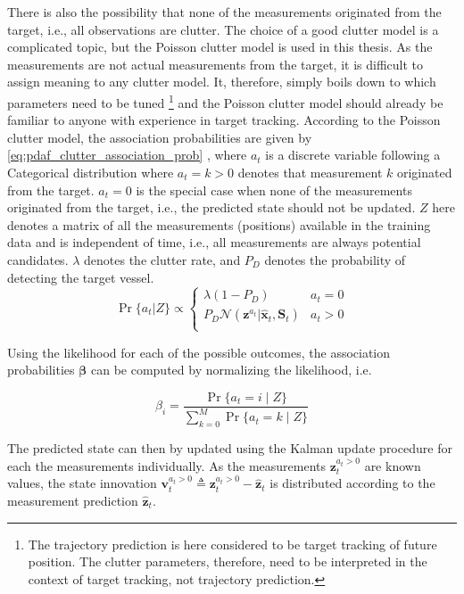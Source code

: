 There is also the possibility that none of the measurements originated from the target, i.e., all observations are clutter. The choice of a good clutter model is a complicated topic, but the Poisson clutter model is used in this thesis. As the measurements are not actual measurements from the target, it is difficult to assign meaning to any clutter model. It, therefore, simply boils down to which parameters need to be tuned \footnote{The trajectory prediction is here considered to be target tracking of future position. The clutter parameters, therefore, need to be interpreted in the context of target tracking, not trajectory prediction.} and the Poisson clutter model should already be familiar to anyone with experience in target tracking.
According to the Poisson clutter model, the association probabilities are given by \cref{eq:pdaf_clutter_association_prob} \cite{sensorfusjon}, where $a_t$ is a discrete variable following a Categorical distribution where $a_t=k > 0$ denotes that measurement $k$ originated from the target. $a_t = 0$ is the special case when none of the measurements originated from the target, i.e., the predicted state should not be updated. $Z$ here denotes a matrix of all the measurements (positions) available in the training data and is independent of time, i.e., all measurements are always potential candidates. $\lambda$ denotes the clutter rate, and $P_D$ denotes the probability of detecting the target vessel.
\begin{equation}\label{eq:pdaf_clutter_association_prob}
    \Pr\{a_t | Z\} \propto \begin{cases}
        \lambda (1 - P_D)                                                                 & a_t = 0 \\
        P_D \mathcal{N} (\boldsymbol{z}^{a_t} | \hat{\boldsymbol{x}}_t, \boldsymbol{S}_t) & a_t > 0 \\
    \end{cases}
\end{equation}

Using the likelihood for each of the possible outcomes, the association probabilities $\boldsymbol{\beta}$ can be computed by normalizing the likelihood, i.e.

\begin{equation}
    \beta_i = \frac{\Pr\{a_t=i \; | \; Z\}}{\sum_{k=0}^M \Pr\{a_t=k \; | \; Z\}}
\end{equation}

The predicted state can then by updated using the Kalman update procedure for each the measurements individually. As the measurements $\boldsymbol{z}_t^{a_t > 0}$ are known values, the state innovation $\boldsymbol{v}_t^{a_t>0} \triangleq \boldsymbol{z}_t^{a_t>0} - \hat{\boldsymbol{z}}_t$ is distributed according to the measurement prediction $\hat{\boldsymbol{z}}_t$.

